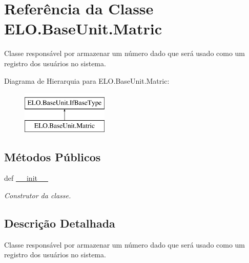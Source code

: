 \hypertarget{classELO_1_1BaseUnit_1_1Matric}{\section{Referência da Classe E\-L\-O.\-Base\-Unit.\-Matric}
\label{classELO_1_1BaseUnit_1_1Matric}
}


Classe responsável por armazenar um número dado que será usado como um registro dos usuários no sistema.  


Diagrama de Hierarquia para E\-L\-O.\-Base\-Unit.\-Matric\-:\begin{figure}[H]
\begin{center}
\leavevmode
\includegraphics[height=2.000000cm]{d6/db2/classELO_1_1BaseUnit_1_1Matric}
\end{center}
\end{figure}
\subsection*{Métodos Públicos}
\begin{DoxyCompactItemize}
\item 
def \hyperlink{classELO_1_1BaseUnit_1_1Matric_a050299f6e8d99a530a4598270b93b8d9}{\-\_\-\-\_\-init\-\_\-\-\_\-}
\begin{DoxyCompactList}\small\item\em Construtor da classe. \end{DoxyCompactList}\end{DoxyCompactItemize}


\subsection{Descrição Detalhada}
Classe responsável por armazenar um número dado que será usado como um registro dos usuários no sistema. 



